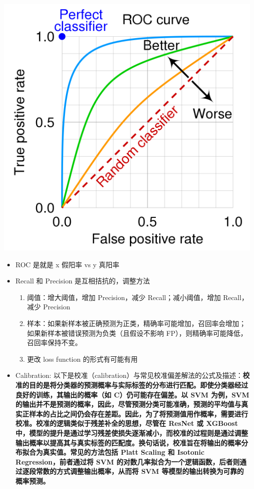 \documentclass[12pt]{article}
\numberwithin{theorem}{section} %
\numberwithin{definition}{section} %
\numberwithin{assumption}{section} %
\numberwithin{lemma}{section} %
\numberwithin{remark}{section} %
\numberwithin{prop}{section} %
\numberwithin{corollary}{section} %
\numberwithin{example}{section} %
\numberwithin{question}{section} %
\numberwithin{problem}{section} %
\numberwithin{conjecture}{section} %
\numberwithin{append}{section} %
\numberwithin{property}{section} %
\begin{document}
\begin{CJK}{UTF8}{gbsn}
\begin{center}
	\includegraphics[scale=0.3]{pics/ROCAUC.png}
\end{center}

\begin{itemize}
	\item ROC 是就是 x 假阳率 vs y 真阳率
	\item Recall 和 Precision 是互相拮抗的，调整方法
	\begin{enumerate}
		\item 阈值：增大阈值，增加 Precision，减少 Recall；减小阈值，增加 Recall，减少 Precision
		\item 样本：如果新样本被正确预测为正类，精确率可能增加，召回率会增加；如果新样本被错误预测为负类（且假设不影响 FP），则精确率可能降低，召回率保持不变。
		\item 更改 loss function 的形式有可能有用
	\end{enumerate}
	\item Calibration: 以下是校准（calibration）与常见校准偏差解法的公式及描述：\textbf{校准的目的是将分类器的预测概率与实际标签的分布进行匹配。即使分类器经过良好的训练，其输出的概率（如 C）仍可能存在偏差。以 SVM 为例，SVM 的输出并不是预测的概率，因此，尽管预测分类可能准确，预测的平均值与真实正样本的占比之间仍会存在差距。因此，为了将预测值用作概率，需要进行校准。校准的逻辑类似于残差补全的思想，尽管在 ResNet 或 XGBoost 中，模型的提升是通过学习残差使损失逐渐减小，而校准的过程则是通过调整输出概率以提高其与真实标签的匹配度。换句话说，校准旨在将输出的概率分布拟合为真实值。常见的方法包括 Platt Scaling 和 Isotonic Regression，前者通过将 SVM 的对数几率拟合为一个逻辑函数，后者则通过逐段常数的方式调整输出概率，从而将 SVM 等模型的输出转换为可靠的概率预测。}
	

\end{itemize}
\end{CJK}
\end{document}

